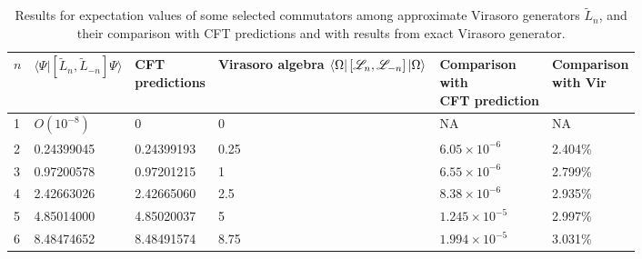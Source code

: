 \documentclass[12pt, nofootinbib]{article}
\theoremstyle{plain}
\theoremstyle{assumption}
\theoremstyle{definition}
\theoremstyle{plain}
\theoremstyle{plain}
\theoremstyle{plain}
\theoremstyle{plain}
\theoremstyle{plain}
\def\Leff{\widetilde{L}}
\def\Lcft{\mathscr{L}}
\begin{document}
\begin{table}[!h]
\begin{tabular}{|l|l|l|l|l|l|}
\hline
$n$ & $\langle   \Psi|[\Leff_n, \Leff_{-n}] \Psi\rangle$ & \makecell{CFT \\ predictions} & \makecell{Virasoro algebra \\ $\bra{\Omega}[\Lcft_{n},\Lcft_{-n}]\ket{\Omega}$} & \makecell{\small Comparison \\ \small with \\ \small CFT prediction} & \makecell{\small  Comparison \\ \small with  \small Vir} \\ \hline
1   & $O(10^{-8})$                                       & 0                                & 0                            & NA                               & NA                                         \\ \hline
2   & 0.24399045                                         & 0.24399193                       & 0.25                         & $6.05\times   10^{-6}$           & 2.404\%                                    \\ \hline
3   & 0.97200578                                         & 0.97201215                       & 1                            & $6.55\times   10^{-6}$           & 2.799\%                                    \\ \hline
4   & 2.42663026                                         & 2.42665060                        & 2.5                          & $8.38\times   10^{-6}$           & 2.935\%                                    \\ \hline
5   & 4.85014000                                         & 4.85020037                       & 5                            & $1.245\times   10^{-5}$          & 2.997\%                                    \\ \hline
6   & 8.48474652                                         & 8.48491574                       & 8.75                         & $1.994\times   10^{-5}$          & 3.031\%                                    \\ \hline
\end{tabular}
\caption{Results for expectation values of some selected commutators among approximate Virasoro generators $\Leff_n$, and their comparison with CFT predictions and with results from exact Virasoro generator.}
\label{tab:commutator-expectations}
\end{table}
\end{document}
